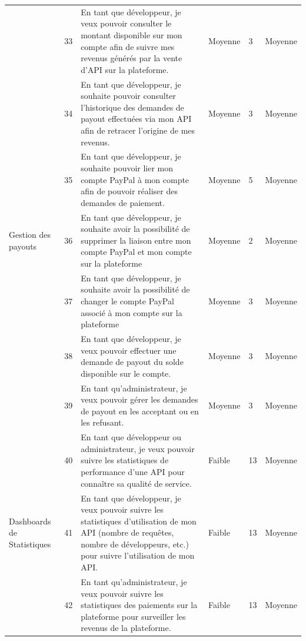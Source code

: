 \begin{landscape}
\begin{longtable}[c]{
    |p{}
    |p{}
    |p{}
    |p{}
    |p{}
    |p{}|
    }
& 33 & En tant que développeur, je veux pouvoir consulter le montant disponible sur mon compte afin de suivre mes revenus générés par la vente d'API sur la plateforme. & Moyenne & 3 & Moyenne \\
\cline{2-2} \cline{3-6}

  & 34 & En tant que développeur, je souhaite pouvoir consulter l'historique des demandes de payout effectuées via mon API afin de retracer l'origine de mes revenus.& Moyenne & 3 & Moyenne \\
\cline{2-2} \cline{3-6}

 & 35 & En tant que développeur, je souhaite pouvoir lier mon compte PayPal à mon compte afin de pouvoir réaliser des demandes de paiement. & Moyenne & 5 & Moyenne \\
 \cline{2-2} \cline{3-6}
 
 Gestion des payouts & 36 &  En tant que développeur, je souhaite avoir la possibilité de supprimer la liaison entre mon compte PayPal et mon compte sur la plateforme & Moyenne & 2 & Moyenne \\
  \cline{2-2} \cline{3-6}
  
   & 37 &    En tant que développeur, je souhaite avoir la possibilité de changer le compte PayPal associé à mon compte sur la plateforme & Moyenne & 3 & Moyenne \\
  \cline{2-2} \cline{3-6}

 & 38 & En tant que développeur, je veux pouvoir effectuer une demande de payout du solde disponible sur le compte. & Moyenne & 3 & Moyenne \\
\cline{2-2} \cline{3-6}

 & 39 & En tant qu'administrateur, je veux pouvoir gérer les demandes de payout en les acceptant ou en les refusant. & Moyenne & 3 & Moyenne \\
\hline
 & 40 & En tant que développeur ou administrateur, je veux pouvoir suivre les statistiques de performance d'une API pour connaître sa qualité de service. & Faible & 13 & Moyenne \\
\cline{2-2} \cline{3-6}
Dashboards de Statistiques & 41 & En tant que développeur, je veux pouvoir suivre les statistiques d'utilisation de mon API (nombre de requêtes, nombre de développeurs, etc.) pour suivre l'utilisation de mon API. & Faible & 13 & Moyenne \\
\cline{2-2} \cline{3-6}
 & 42 & En tant qu'administrateur, je veux pouvoir suivre les statistiques des paiements sur la plateforme pour surveiller les revenus de la plateforme. & Faible & 13 & Moyenne \\
\hline


\end{longtable}
\end{landscape}
